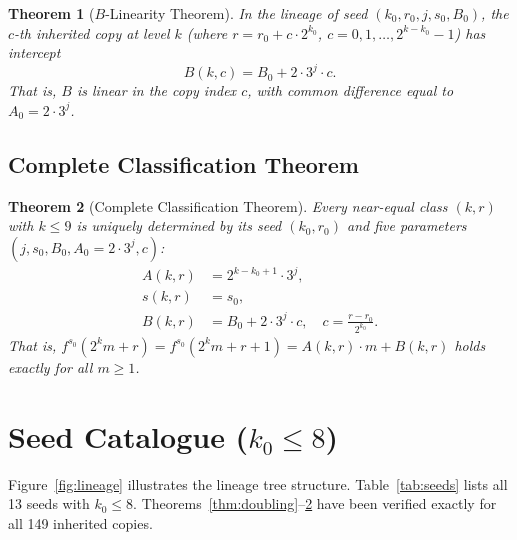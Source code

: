 \documentclass[twocolumn,a4paper,10pt]{article}
\newtheorem{theorem}{Theorem}[section]
\begin{document}
\begin{theorem}[$B$-Linearity Theorem]\label{thm:blinear}
In the lineage of seed $(k_0, r_0, j, s_0, B_0)$,
the $c$-th inherited copy at level $k$
(where $r = r_0 + c \cdot 2^{k_0}$, $c = 0, 1, \ldots, 2^{k-k_0}-1$)
has intercept
\[
  B(k, c) = B_0 + 2 \cdot 3^j \cdot c.
\]
That is, $B$ is linear in the copy index $c$,
with common difference equal to $A_0 = 2 \cdot 3^j$.
\end{theorem}

\subsection{Complete Classification Theorem}

\begin{theorem}[Complete Classification Theorem]\label{thm:classification}
Every near-equal class $(k, r)$ with $k \leq 9$ is uniquely determined by
its seed $(k_0, r_0)$ and five parameters $(j, s_0, B_0, A_0 = 2\cdot 3^j, c)$:
\begin{align}
  A(k, r) &= 2^{k - k_0 + 1} \cdot 3^j, \label{eq:A}\\
  s(k, r) &= s_0, \label{eq:s}\\
  B(k, r) &= B_0 + 2 \cdot 3^j \cdot c,\quad c = \tfrac{r - r_0}{2^{k_0}}. \label{eq:B}
\end{align}
That is, $f^{s_0}(2^k m + r) = f^{s_0}(2^k m + r + 1) = A(k,r)\cdot m + B(k,r)$
holds exactly for all $m \geq 1$.
\end{theorem}

\section{Seed Catalogue ($k_0 \leq 8$)}

Figure~\ref{fig:lineage} illustrates the lineage tree structure.
Table~\ref{tab:seeds} lists all 13 seeds with $k_0 \leq 8$.
Theorems~\ref{thm:doubling}--\ref{thm:classification} have been verified
exactly for all 149 inherited copies.
\end{document}

